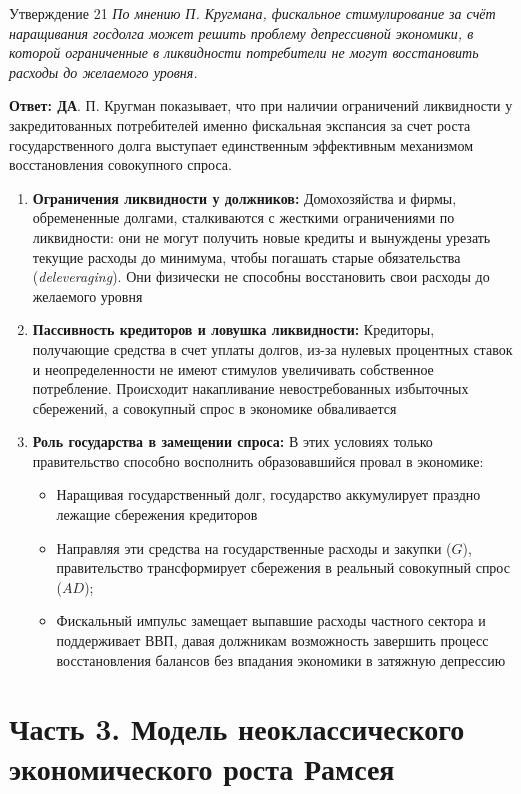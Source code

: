 \documentclass[10pt,a4paper]{article}
\newcommand{\qda}{\textbf{\color{yesgreen}Ответ: ДА}}
\newenvironment{answer}[2]{%
  \begin{qbox}{Утверждение #1}
  \textit{#2}\par\smallskip
}{%
  \end{qbox}\vspace{2pt}
}
\begin{document}
\begin{answer}{21}{По мнению П. Кругмана, фискальное стимулирование за счёт наращивания госдолга может решить проблему депрессивной экономики, в которой ограниченные в ликвидности потребители не могут восстановить расходы до желаемого уровня.}
\qda. П. Кругман показывает, что при наличии ограничений ликвидности у закредитованных потребителей именно фискальная экспансия за счет роста государственного долга выступает единственным эффективным механизмом восстановления совокупного спроса.

\begin{enumerate}
    \item \textbf{Ограничения ликвидности у должников:}
    Домохозяйства и фирмы, обремененные долгами, сталкиваются с жесткими ограничениями по ликвидности: они не могут получить новые кредиты и вынуждены урезать текущие расходы до минимума, чтобы погашать старые обязательства (\textit{deleveraging}). Они физически не способны восстановить свои расходы до желаемого уровня

    \item \textbf{Пассивность кредиторов и ловушка ликвидности:}
    Кредиторы, получающие средства в счет уплаты долгов, из-за нулевых процентных ставок и неопределенности не имеют стимулов увеличивать собственное потребление. Происходит накапливание невостребованных избыточных сбережений, а совокупный спрос в экономике обваливается

    \item \textbf{Роль государства в замещении спроса:}
    В этих условиях только правительство способно восполнить образовавшийся провал в экономике:
    \begin{itemize}
        \item Наращивая государственный долг, государство аккумулирует праздно лежащие сбережения кредиторов
        \item Направляя эти средства на государственные расходы и закупки ($G$), правительство трансформирует сбережения в реальный совокупный спрос ($AD$);
        \item Фискальный импульс замещает выпавшие расходы частного сектора и поддерживает ВВП, давая должникам возможность завершить процесс восстановления балансов без впадания экономики в затяжную депрессию
    \end{itemize}
\end{enumerate}
\end{answer}

\newpage
\section{Часть 3. Модель неоклассического экономического роста Рамсея}
\end{document}
